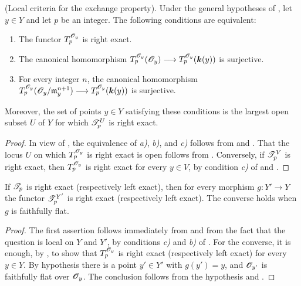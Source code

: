 \begin{proposition}[7.7.10]
\label{III.7.7.10}
\textnormal{(Local criteria for the exchange property).}
Under the general hypotheses of , let
$y\in Y$ and let $p$ be an integer.  The following
conditions are equivalent:
\begin{enumerate}
  \item[\textup{a)}] The functor $T_p^{\mathscr{O}_y}$ is right exact.

  \item[\textup{b)}] The canonical homomorphism $T_p^{\mathscr{O}_y}(\mathscr{O}_y)
\longrightarrow
T_p^{\mathscr{O}_y}(\boldsymbol{k}(y))$
    is surjective.

  \item[\textup{c)}] For every integer $n$, the canonical
    homomorphism $T_p^{\mathscr{O}_y}
(\mathscr{O}_y/\mathfrak m_y^{n+1})
\longrightarrow
T_p^{\mathscr{O}_y}(\boldsymbol{k}(y))$
    is surjective.
\end{enumerate}
Moreover, the set of points $y\in Y$ satisfying these
conditions is the largest open subset $U$ of $Y$ for which
$\mathscr{T}^U_p$ is right exact.
\end{proposition}

\begin{proof}
In view of , the equivalence of \emph{a)}, \emph{b)}, and
\emph{c)} follows from  and .
That the locus $U$ on which $T_p^{\mathscr{O}_y}$ is right exact
is open follows from .  Conversely, if
$\mathscr{T}^V_p$ is right exact, then
$T_p^{\mathscr{O}_y}$ is right exact for every $y\in V$, by
condition \emph{c)} of  and .
\end{proof}

\begin{corollary}[7.7.11]
\label{III.7.7.11}
If $\mathscr{T}_p$ is right exact \textup{(respectively} left exact\textup{)}, then
for every morphism $g:Y'\to Y$ the functor
$\mathscr{T}^{Y'}_p$ is right exact \textup{(respectively} left exact\textup{)}.
The converse holds when $g$ is faithfully flat.
\end{corollary}

\begin{proof}
The first assertion follows immediately from
 and from the fact that the question is
local on $Y$ and $Y'$, by conditions \emph{c)} and \emph{b)} of
.  For the converse, it is enough, by
, to show that $T_p^{\mathscr{O}_y}$ is right
exact (respectively left exact) for every $y\in Y$.  By
hypothesis there is a point $y'\in Y'$ with $g(y')=y$, and
$\mathscr{O}_{y'}$ is faithfully flat over $\mathscr{O}_y$.  The
conclusion follows from the hypothesis and
.
\end{proof}

